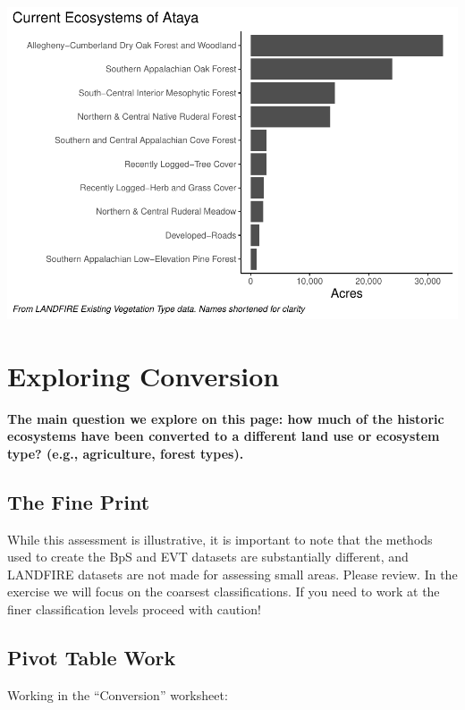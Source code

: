 \documentclass[
]{book}
\begin{document}
\includegraphics{FSCBook_files/figure-latex/evtChart-1.pdf}

\hypertarget{conversion}{%
\chapter{Exploring Conversion}\label{conversion}}

\textbf{The main question we explore on this page: how much of the historic ecosystems have been converted to a different land use or ecosystem type? (e.g., agriculture, forest types).}

\hypertarget{the-fine-print}{%
\section{The Fine Print}\label{the-fine-print}}

While this assessment is illustrative, it is important to note that the methods used to create the BpS and EVT datasets are substantially different, and LANDFIRE datasets are not made for assessing small areas. Please review. In the exercise we will focus on the coarsest classifications. If you need to work at the finer classification levels proceed with caution!

\hypertarget{pivot-table-work}{%
\section{Pivot Table Work}\label{pivot-table-work}}

Working in the ``Conversion'' worksheet:
\end{document}
